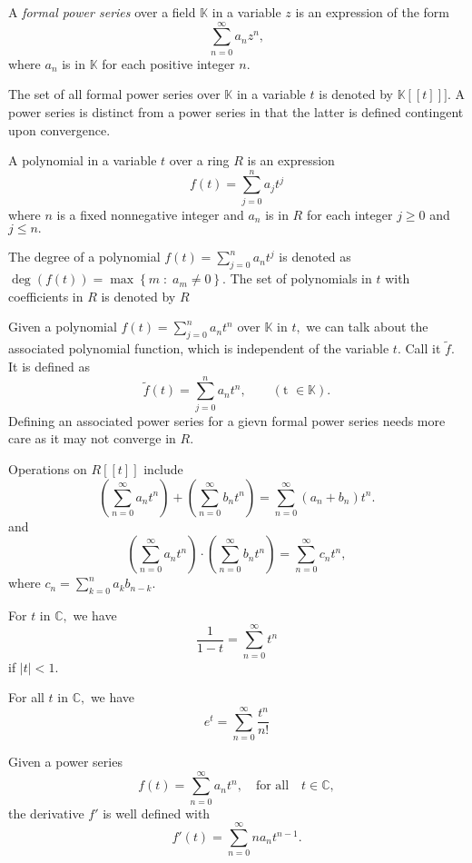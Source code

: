 
\begin{definition}
	A \emph{formal power series} over a field $\mathbb{K}$ in a variable $z$
	is an expression of the form
	$$ \sum_{n=0}^{\infty} a_n z^n,$$
	where $a_n$ is in $\mathbb{K}$ for each positive integer $n.$
\end{definition}
The set of all formal power series over $\mathbb{K}$ 
in a variable $t$ is denoted by $ \mathbb{K} [[t]]].$
A power series is distinct from a power series in that the latter 
is defined contingent upon convergence.
\begin{definition}[Polynomial]
	A polynomial in a variable $t$ over a ring $R$ is an expression
	$$ f(t) = \sum_{j=0}^{n} a_j t^j $$
	where $n$ is a fixed nonnegative integer and $a_n$ is in $R$ for each integer $j \geq 0$ and $j \leq n.$
\end{definition}
The degree of a polynomial $f(t) = \sum_{j=0}^{n} a_n t^j$ is denoted as
$\deg(f(t)) = \max \left\{ m \; : \; a_m \not = 0 \right\}.$ The set of polynomials in $t$
with coefficients in $R$ is denoted by $R$

Given a polynomial $f(t) = \sum_{j=0}^{n}  a_n t^n$ over $\mathbb{K}$ in $t,$ we can talk
about the associated polynomial function, which is independent of the variable $t.$
Call it $\tilde{f}.$ It is defined as 
$$ \tilde{f} (t) = \sum_{j=0}^{n} a_n t^n, \qquad (\text{t } \in \mathbb{K} ).$$
Defining an associated power series for a gievn formal power series needs more care
as it may not converge in $R.$

Operations on $R [[t]]$ include
$$ \left( \sum_{n=0}^{\infty} a_n t^n \right) 
+ \left( \sum_{n=0}^{\infty} b_n t^n \right) 
= \sum_{n=0}^{\infty} (a_n + b_n ) t^n.$$
and
$$ \left( \sum_{n=0}^{\infty} a_n t^n \right) 
\cdot \left( \sum_{n=0}^{\infty} b_n t^n \right) 
 = \sum_{n=0}^{\infty} c_n t^n,$$
 where $c_n = \sum_{k=0}^{n} a_k b_{n-k}.$
\begin{example}
	For $t$ in $\mathbb{C},$ we have
	$$ \frac{1}{1-t} = \sum_{n=0}^{\infty}  t^n $$
	if $ \lvert t \rvert < 1.$
\end{example}

\begin{example}
	For all $t $ in $\mathbb{C},$ we have
	$$ e^t = \sum_{n=0}^{\infty} \frac{t^n}{n!} $$
\end{example}

\begin{example}
	Given a power series 
	$$f(t) = \sum_{n=0}^{\infty} a_n t^n, \quad \text{for all} \quad t \in \mathbb{C},$$
	the derivative $f'$ is well defined with
	$$f'(t) = \sum_{n=0}^{\infty} n a_n t^{n-1} .$$
\end{example}


